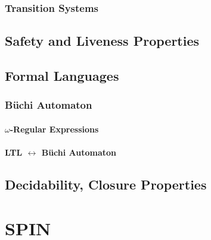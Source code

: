 \documentclass[a4paper, 11pt, accentcolor = tud3b]{tudreport}
\begin{document}
			\subsection{Transition Systems} %

		\section{Safety and Liveness Properties} %

		\section{Formal Languages} %

			\subsection{Büchi Automaton} %

				\subsubsection{\(\omega\)-Regular Expressions} %

				\subsubsection{LTL \(\leftrightarrow\) Büchi Automaton} %

		\section{Decidability, Closure Properties} %

	\chapter{SPIN} %
		\label{c:spin}
	
		
\end{document}

